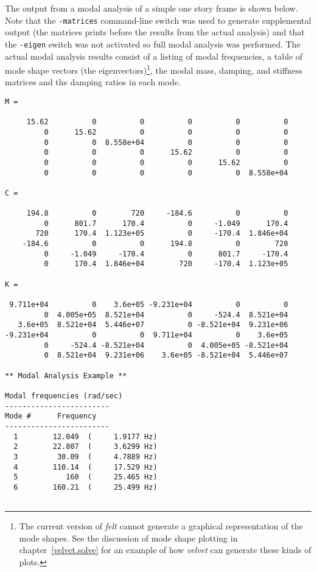 The output from a modal analysis of a simple one story frame is shown
below.  Note that the {\tt -matrices} command-line
switch was used to generate supplemental output (the matrices prints
before the results from the actual analysis) and that the {\tt -eigen}
switch was not activated so full modal analysis was performed.  
The actual modal analysis results consist of a listing of modal
frequencies, a table of mode shape vectors 
(the eigenvectors)\footnote{The current version of {\em felt} cannot 
generate a graphical representation of the mode shapes.  See the
discussion of mode shape plotting in chapter~\ref{velvet.solve} for
an example of how {\em velvet} can generate these kinds of plots.},
the modal mass, damping, and stiffness matrices and the damping ratios
in each mode.
\begin{screen}
 \begin{verbatim}
M = 

     15.62          0          0          0          0          0 
         0      15.62          0          0          0          0 
         0          0  8.558e+04          0          0          0 
         0          0          0      15.62          0          0 
         0          0          0          0      15.62          0 
         0          0          0          0          0  8.558e+04 

C = 

     194.8          0        720     -184.6          0          0 
         0      801.7      170.4          0     -1.049      170.4 
       720      170.4  1.123e+05          0     -170.4  1.846e+04 
    -184.6          0          0      194.8          0        720 
         0     -1.049     -170.4          0      801.7     -170.4 
         0      170.4  1.846e+04        720     -170.4  1.123e+05 

K = 

 9.711e+04          0    3.6e+05 -9.231e+04          0          0 
         0  4.005e+05  8.521e+04          0     -524.4  8.521e+04 
   3.6e+05  8.521e+04  5.446e+07          0 -8.521e+04  9.231e+06 
-9.231e+04          0          0  9.711e+04          0    3.6e+05 
         0     -524.4 -8.521e+04          0  4.005e+05 -8.521e+04 
         0  8.521e+04  9.231e+06    3.6e+05 -8.521e+04  5.446e+07 

** Modal Analysis Example **

Modal frequencies (rad/sec)
------------------------
Mode #      Frequency
------------------------
  1        12.049  (     1.9177 Hz)
  2        22.807  (     3.6299 Hz)
  3         30.09  (     4.7889 Hz)
  4        110.14  (     17.529 Hz)
  5           160  (     25.465 Hz)
  6        160.21  (     25.499 Hz)


\end{verbatim}
\end{screen}
